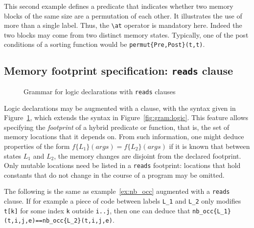 \begin{example}
  This second example defines a predicate that indicates whether two
  memory blocks of the same size are a permutation of each other. It
  illustrates the use of more than a single label. Thus, the \lstinline|\at|
  operator is mandatory here. Indeed the two blocks
  may come from two distinct memory states. Typically, one of the post
  conditions of a sorting function would be \lstinline|permut{Pre,Post}(t,t)|.
\end{example}


\subsection{Memory footprint specification: \texorpdfstring{\lstinline|reads|}{reads} clause}

\begin{figure}[htp]
  \begin{cadre}
      
    \end{cadre}
  \caption{Grammar for logic declarations with \lstinline|reads| clauses}
\label{fig:gram:logicreads}
\end{figure}


\experimental

Logic declarations may be augmented with a \reads{} clause, with the
syntax given in Figure~\ref{fig:gram:logicreads}, which extends the
syntax in Figure~\ref{fig:gram:logic}. This feature allows specifying the
\emph{footprint} of a hybrid predicate or function, that is, the set of
memory locations that it depends on. From such information, one
might deduce properties of the form $f\{L_1\}(args) = f\{L_2\}(args)$
if it is known that between states $L_1$ and $L_2$, the memory changes are
disjoint from the declared footprint.
Only mutable locations need be listed in a \lstinline|reads| footprint:
locations that hold constants that do not change in the course of a program may be omitted.

\begin{example}
  The following is the same as example~\ref{ex:nb_occ} augmented with
  a \lstinline|reads| clause.
  If for example a
  piece of code between labels \lstinline|L_1| and \lstinline|L_2|
  only modifies \lstinline|t[k]| for
  some index \lstinline|k| outside \lstinline|i..j|, then one can deduce that
  \lstinline|nb_occ{L_1}(t,i,j,e)==nb_occ{L_2}(t,i,j,e)|.
\end{example}

